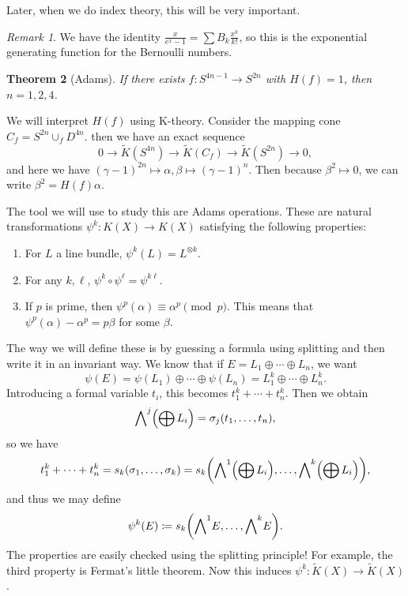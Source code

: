\documentclass[leqno, openany]{memoir}
\newtheorem{thm}{Theorem}[section]
\theoremstyle{definition}
\theoremstyle{remark}
\newtheorem{rmk}[thm]{Remark}
\theoremstyle{plain}
\theoremstyle{definition}
\theoremstyle{remark}
\newcommand{\wt}[1]{\widetilde{#1}}
\begin{document}
Later, when we do index theory, this will be very important.

\begin{rmk} We have the identity $\frac{x}{e^x - 1} = \sum B_k \frac{x^k}{k!}$,
so this is the exponential generating function for the Bernoulli numbers.
\end{rmk}

\begin{thm}[Adams] If there exists $f \colon S^{4n-1} \to S^{2n}$ with $H(f) =
1$, then $n = 1,2,4$.  \end{thm}

We will interpret $H(f)$ using K-theory. Consider the mapping cone $C_f =
S^{2n} \cup_f D^{4n}$. then we have an exact sequence \[ 0 \to \wt{K}(S^{4n})
\to \wt{K}(C_f) \to \wt{K}(S^{2n}) \to 0, \] and here we have
${(\gamma-1)}^{2n} \mapsto \alpha, \beta \mapsto {(\gamma-1)}^n$. Then because
$\beta^2 \mapsto 0$, we can write $\beta^2 = H(f) \alpha$.

The tool we will use to study this are Adams operations. These are natural
transformations $\psi^k \colon K(X) \to K(X)$ satisfying the following
properties: \begin{enumerate} \item For $L$ a line bundle, $\psi^k(L) =
    L^{\otimes k}$.  \item For any $k, \ell$, $\psi^k \circ \psi^{\ell} =
    \psi^{k\ell}$.  \item If $p$ is prime, then $\psi^p(\alpha) \equiv \alpha^p
    \pmod p$. This means that $\psi^p(\alpha) - \alpha^p = p\beta$ for some
    $\beta$.  \end{enumerate}

The way we will define these is by guessing a formula using splitting and then
write it in an invariant way. We know that if $E = L_1 \oplus \cdots \oplus
L_n$, we want \[ \psi(E) = \psi(L_1) \oplus \cdots \oplus \psi(L_n) = L_1^k
\oplus \cdots \oplus L_n^k. \] Introducing a formal variable $t_i$, this
becomes $t_1^k + \cdots + t_n^k$. Then we obtain \[ {\bigwedge}^j\qty(\bigoplus
    L_i) = \sigma_j(t_1, \ldots, t_n), \] so we have \[ t_1^k + \cdots + t_n^k
= s_k(\sigma_1, \ldots, \sigma_k) = s_k \qty({\bigwedge}^1\qty(\bigoplus L_i),
\ldots, {\bigwedge}^k \qty(\bigoplus L_i)), \] and thus we may define \[
\psi^k(E) \coloneqq s_k \qty({\bigwedge}^1 E, \ldots, {\bigwedge}^k E). \] The
properties are easily checked using the splitting principle! For example, the
third property is Fermat's little theorem. Now this induces $\psi^k \colon
\wt{K}(X) \to \wt{K}(X)$.
\end{document}
